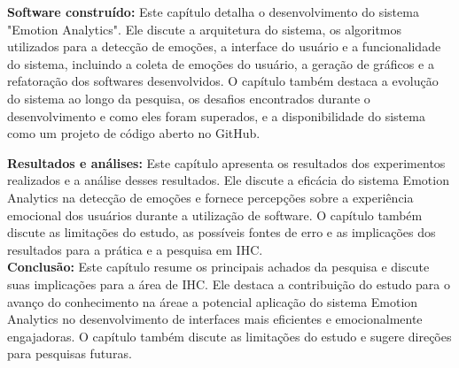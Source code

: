 \begin{resumo-portugues}
  \textbf{Software construído:} Este capítulo detalha o desenvolvimento do sistema "Emotion Analytics". Ele discute a arquitetura do sistema, os algoritmos utilizados para a detecção de emoções, a interface do usuário e a funcionalidade do sistema, incluindo a coleta de emoções do usuário, a geração de gráficos e a refatoração dos softwares desenvolvidos. O capítulo também destaca a evolução do sistema ao longo da pesquisa, os desafios encontrados durante o desenvolvimento e como eles foram superados, e a disponibilidade do sistema como um projeto de código aberto no GitHub.
  \pagebreak

  \textbf{Resultados e análises:} Este capítulo apresenta os resultados dos experimentos realizados e a análise desses resultados. Ele discute a eficácia do sistema Emotion Analytics na detecção de emoções e fornece percepções sobre a experiência emocional dos usuários durante a utilização de software. O capítulo também discute as limitações do estudo, as possíveis fontes de erro e as implicações dos resultados para a prática e a pesquisa em IHC.
  \\

  \textbf{Conclusão:} Este capítulo resume os principais achados da pesquisa e discute suas implicações para a área de IHC. Ele destaca a contribuição do estudo para o avanço do conhecimento na áreae a potencial aplicação do sistema Emotion Analytics no desenvolvimento de interfaces mais eficientes e emocionalmente engajadoras. O capítulo também discute as limitações do estudo e sugere direções para pesquisas futuras.
\end{resumo-portugues}
